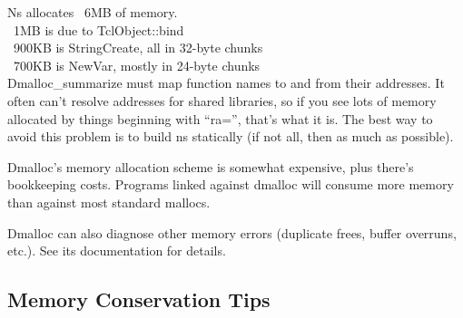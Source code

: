 Ns allocates ~6MB of memory. \\
~1MB is due to TclObject::bind \\
~900KB is StringCreate, all in 32-byte chunks \\
~700KB is NewVar, mostly in 24-byte chunks \\
Dmalloc\_summarize must map function names to and from their addresses. It
often can't resolve addresses for shared libraries, so if you see lots of
memory allocated by things beginning with ``ra='', that's what it is. The
best way to avoid this problem is to build ns statically (if not all, then
as much as possible). 

Dmalloc's memory allocation scheme is somewhat expensive, plus there's
bookkeeping costs. Programs linked against dmalloc will consume more
memory than against most standard mallocs. 

Dmalloc can also diagnose other memory errors (duplicate frees, buffer
overruns, etc.). See its documentation for details. 


\subsection{Memory Conservation Tips}
\label{sec:memconserve}

